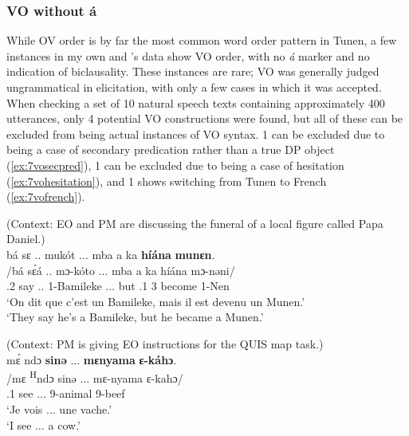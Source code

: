 \documentclass[output=paper,colorlinks,citecolor=brown
]{langscibook}
\begin{document}
\subsubsection{VO without á}
While OV order is by far the most common word order pattern in Tunen, a few instances in my own and \citeauthor{Dugast1971}'s \citeyearpar{Dugast1971, Dugast1975} data show VO order, with no \textit{á} marker and no indication of biclausality. These instances are rare; VO was generally judged ungrammatical in elicitation, with only a few cases in which it was accepted. When checking a set of 10 natural speech texts containing approximately 400 utterances, only 4 potential VO constructions were found, but all of these can be excluded from being actual instances of VO syntax. 1 can be excluded due to being a case of secondary predication rather than a true DP object (\ref{ex:7vosecpred}), 1 can be excluded due to being a case of hesitation (\ref{ex:7vohesitation}), and 1 shows switching from Tunen to French (\ref{ex:7vofrench}).

\ea
\label{ex:7vosecpred}
(Context: EO and PM are discussing the funeral of a local figure called Papa Daniel.) \\
\glll
{\db}bá sɛ .. mukót ... mba a ka \textbf{híána} \textbf{munɛn}. \\
/bá sɛ́á .. mɔ-kóto ... mba a ka híána mɔ-nəni/ \\
\SM{}.2 say .. 1-Bamileke ... but \SM.1 \PST{}3 become 1-Nen \\
\glt
`On dit que c'est un Bamileke, mais il est devenu un Munen.' \\ `They say he's a Bamileke, but he became a Munen.' \jambox*{[EO 1037] }
\z

\ea
\label{ex:7vohesitation}
(Context: PM is giving EO instructions for the QUIS map task.) \\
\glll
{\db}mɛ́ ndɔ \textbf{sinə} ... \textbf{mɛnyama} \textbf{ɛ-káhɔ}. \\
/mɛ \textsuperscript{H}ndɔ sinə ... mɛ-nyama ɛ-kahɔ/ \\
{\db}\SM.1\SG{} \PRS{} see ... 9-animal 9-beef \\
\glt
`Je vois ... une vache.' \\ `I see ... a cow.' \jambox*{[EO 664]}

 \z
\end{document}
